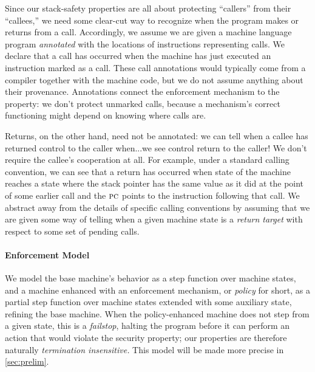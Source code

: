 \documentclass[acmsmall,review,anonymous]{acmart}\settopmatter{printfolios=true,printccs=false,printacmref=false}
\begin{document}
{Since our stack-safety properties are all about protecting ``callers'' from
their ``callees,'' we need some clear-cut way to recognize when the program
makes or returns from a call.  Accordingly, we assume we are given a machine
language program {\em annotated} with the locations of instructions
representing calls.  We declare that a call has occurred when the machine
has just executed an instruction marked as a call.
%
These call annotations would typically come from a compiler together with
the machine code, but we do not assume anything about their provenance.
Annotations connect the enforcement mechanism to the property: we don't
protect unmarked calls, because a mechanism's correct functioning might
depend on knowing where calls are.

Returns, on the other hand, need not be annotated: we can tell when a callee
has returned control to the caller when...we see control return to the
caller! We don't require the callee's cooperation at all.
For example, under a standard calling convention, we can see that a
return has occurred when state of the machine reaches a state where
the stack pointer has the same value as it did at the point of some earlier
call and the $\textsc{pc}$ points to the instruction following that call.  We
abstract away from the details of specific calling conventions by assuming
that we are given some way of telling when a given machine state is a
{\em return target} with respect to some set of pending calls.


\paragraph*{Enforcement Model}

We model the base machine's behavior as a step function over machine states,
and a machine
enhanced with an enforcement mechanism, or {\em policy} for short, as a
partial step function over machine states extended with some
auxiliary state, refining the base machine. When the policy-enhanced machine
does not step from a given state, this is a {\em failstop}, halting the program before it can perform an
action that would violate the security property;
our properties are therefore naturally \emph{termination insensitive.}
This model will be made more precise in \cref{sec:prelim}.

}
\end{document}
